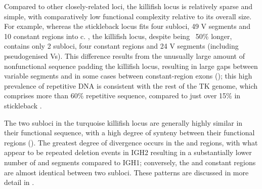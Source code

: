 Compared to other closely-related loci, the killifish locus is relatively sparse and simple, with comparatively low functional complexity relative to its overall size. For example, whereas the stickleback locus fits four subloci, 49 V segments and 10 constant regions into c.  \parencite{bao2010stickleback,gambondeza2011stickleback}, the killifish locus, despite being ~50\% longer, contains only 2 subloci, four constant regions and 24 V segments (including pseudogenised Vs). This difference results from the unusually large amount of nonfunctional sequence padding the killifish locus, resulting in large gaps between variable segments and in some cases between constant-region exons (); this high prevalence of repetitive DNA is consistent with the rest of the TK genome, which comprises more than 60\% repetitive sequence, compared to just over 15\% in stickleback \parencite{yuan2018repeats}. %
	
The two subloci in the turquoise killifish locus are generally highly similar in their functional sequence, with a high degree of synteny between their functional regions (). The greatest degree of divergence occurs in the \vh and \dh regions, with what appear to be repeated deletion events in IGH2 resulting in a substantially lower number of \vh and \dh segments compared to IGH1; conversely, the \jh and constant regions are almost identical between two subloci. These patterns are discussed in more detail in .
	
